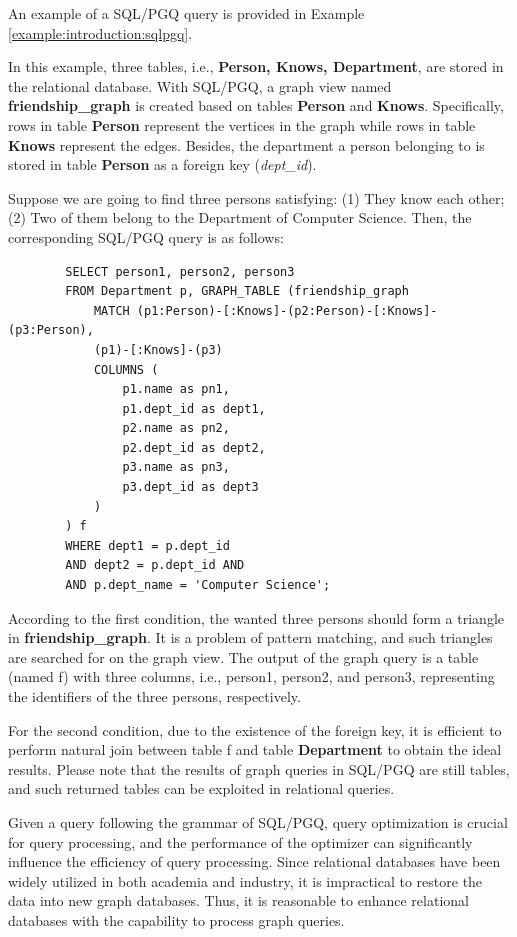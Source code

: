 An example of a SQL/PGQ query is provided in Example \ref{example:introduction:sqlpgq}.

\begin{example}
    \label{example:introduction:sqlpgq}
    In this example, three tables, i.e., \textbf{Person, Knows, Department}, are stored in the relational database.
    With SQL/PGQ, a graph view named \textbf{friendship\_graph} is created based on tables \textbf{Person} and \textbf{Knows}.
    Specifically, rows in table \textbf{Person} represent the vertices in the graph while rows in table \textbf{Knows} represent the edges.
    Besides, the department a person belonging to is stored in table \textbf{Person} as a foreign key (\textit{dept\_id}).

    Suppose we are going to find three persons satisfying: (1) They know each other; (2) Two of them belong to the Department of Computer Science.
    Then, the corresponding SQL/PGQ query is as follows:
    \begin{lstlisting}
        SELECT person1, person2, person3
        FROM Department p, GRAPH_TABLE (friendship_graph
            MATCH (p1:Person)-[:Knows]-(p2:Person)-[:Knows]-(p3:Person),
            (p1)-[:Knows]-(p3)
            COLUMNS (
                p1.name as pn1,
                p1.dept_id as dept1,
                p2.name as pn2,
                p2.dept_id as dept2,
                p3.name as pn3,
                p3.dept_id as dept3
            )
        ) f
        WHERE dept1 = p.dept_id
        AND dept2 = p.dept_id AND
        AND p.dept_name = 'Computer Science';
    \end{lstlisting}
    According to the first condition, the wanted three persons should form a triangle in \textbf{friendship\_graph}.
    It is a problem of pattern matching, and such triangles are searched for on the graph view.
    The output of the graph query is a table (named f) with three columns, i.e., person1, person2, and person3, representing the identifiers of the three persons, respectively.

    For the second condition, due to the existence of the foreign key, it is efficient to perform natural join between table f and table \textbf{Department} to obtain the ideal results.
    Please note that the results of graph queries in SQL/PGQ are still tables, and such returned tables can be exploited in relational queries.
\end{example}

Given a query following the grammar of SQL/PGQ, query optimization is crucial for query processing, and the performance of the optimizer can significantly influence the efficiency of query processing.
Since relational databases have been widely utilized in both academia and industry, it is impractical to restore the data into new graph databases.
Thus, it is reasonable to enhance relational databases with the capability to process graph queries.

